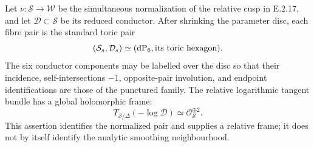 \begin{proposition}
Let $\nu:\mathcal S\to\mathcal W$ be the
simultaneous normalization of the relative cusp
in E.2.17, and let $\mathcal D\subset\mathcal S$
be its reduced conductor.  After shrinking the
parameter disc, each fibre pair is the standard
toric pair
\[
 (\mathcal S_s,\mathcal D_s)
 \simeq(\mathrm{dP}_6,\hbox{its toric hexagon}).
\]
The six conductor components may be labelled over
the disc so that their incidence, self-intersections
$-1$, opposite-pair involution, and endpoint
identifications are those of the punctured family.
The relative logarithmic tangent bundle has a
global holomorphic frame:
\[
 T_{\mathcal S/\Delta}(-\log\mathcal D)
 \simeq\mathcal O_{\mathcal S}^{\oplus2}.
\]
This assertion identifies the normalized pair
and supplies a relative frame; it does not by
itself identify the analytic smoothing neighbourhood.
\end{proposition}
